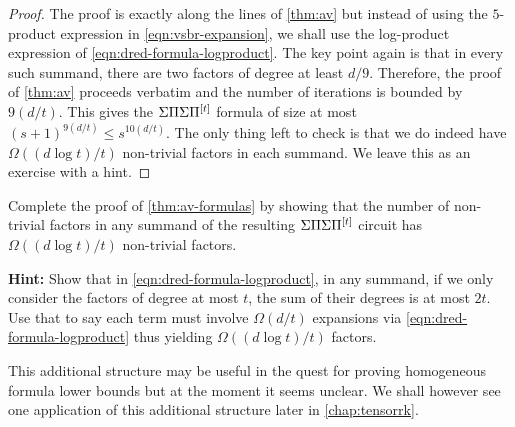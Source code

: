 \begin{proof}The proof is exactly along the lines of \autoref{thm:av}
  but instead of using the $5$-product expression in \eqref{eqn:vsbr-expansion}, we shall use the log-product expression of \eqref{eqn:dred-formula-logproduct}.
The key point again is that in every such summand, there are two factors of degree at least $d/9$.
Therefore, the proof of \autoref{thm:av} proceeds verbatim and the number of iterations is bounded by $9(d/t)$.
This gives the $\Sigma\Pi\Sigma\Pi^{[t]}$ formula of size at most $(s+1)^{9(d/t)} \leq s^{10(d/t)}$.
The only thing left to check is that we do indeed have $\Omega((d\log t) / t)$ non-trivial factors in each summand. We leave this as an exercise with a hint. 
\end{proof}

\begin{exercise} Complete the proof of \autoref{thm:av-formulas} by showing that the number of non-trivial factors in any summand of the resulting $\Sigma\Pi\Sigma\Pi^{[t]}$ circuit has $\Omega((d\log t)/t)$ non-trivial factors. 

{\bf Hint:} Show that in \eqref{eqn:dred-formula-logproduct}, in any summand, if we only consider the factors of degree at most $t$, the sum of their degrees is at most $2t$. Use that to say each term must involve $\Omega(d/t)$ expansions via \eqref{eqn:dred-formula-logproduct} thus yielding $\Omega((d\log t)/t)$ factors. 
\end{exercise}

This additional structure may be useful in the quest for proving homogeneous formula lower bounds but at the moment it seems unclear. We shall however see one application of this additional structure later in \autoref{chap:tensorrk}. 
